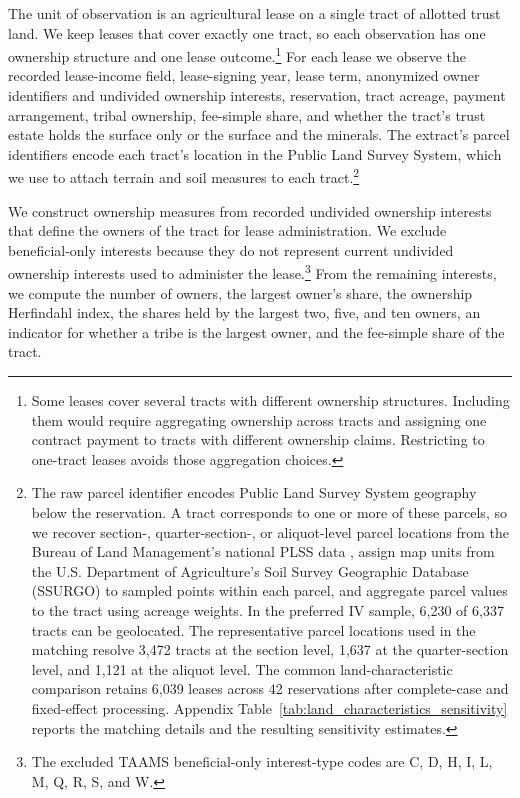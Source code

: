 \documentclass[12pt]{article}
\begin{document}
The unit of observation is an agricultural lease on a single tract of allotted trust land. We keep leases that cover exactly one tract, so each observation has one ownership structure and one lease outcome.\footnote{Some leases cover several tracts with different ownership structures. Including them would require aggregating ownership across tracts and assigning one contract payment to tracts with different ownership claims. Restricting to one-tract leases avoids those aggregation choices.} For each lease we observe the recorded lease-income field, lease-signing year, lease term, anonymized owner identifiers and undivided ownership interests, reservation, tract acreage, payment arrangement, tribal ownership, fee-simple share, and whether the tract's trust estate holds the surface only or the surface and the minerals. The extract's parcel identifiers encode each tract's location in the Public Land Survey System, which we use to attach terrain and soil measures to each tract.\footnote{The raw parcel identifier encodes Public Land Survey System geography below the reservation. A tract corresponds to one or more of these parcels, so we recover section-, quarter-section-, or aliquot-level parcel locations from the Bureau of Land Management's national PLSS data \citep{BLMNationalPLSS}, assign map units from the U.S. Department of Agriculture's Soil Survey Geographic Database (SSURGO) \citep{SoilSurveyStaffSSURGO} to sampled points within each parcel, and aggregate parcel values to the tract using acreage weights. In the preferred IV sample, 6,230 of 6,337 tracts can be geolocated. The representative parcel locations used in the matching resolve 3,472 tracts at the section level, 1,637 at the quarter-section level, and 1,121 at the aliquot level. The common land-characteristic comparison retains 6,039 leases across 42 reservations after complete-case and fixed-effect processing. Appendix Table~\ref{tab:land_characteristics_sensitivity} reports the matching details and the resulting sensitivity estimates.}

We construct ownership measures from recorded undivided ownership interests that define the owners of the tract for lease administration. We exclude beneficial-only interests because they do not represent current undivided ownership interests used to administer the lease.\footnote{The excluded TAAMS beneficial-only interest-type codes are C, D, H, I, L, M, Q, R, S, and W.} From the remaining interests, we compute the number of owners, the largest owner's share, the ownership Herfindahl index, the shares held by the largest two, five, and ten owners, an indicator for whether a tribe is the largest owner, and the fee-simple share of the tract.
\end{document}
